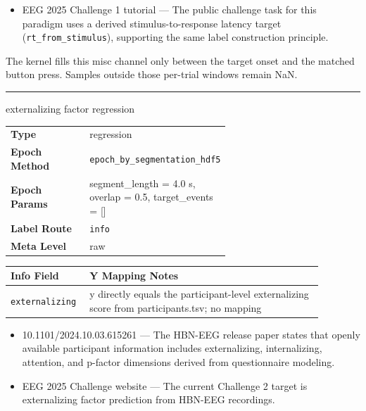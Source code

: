 {\begin{tcolorbox}
\begin{itemize}[leftmargin=1.3em,noitemsep,topsep=1pt]
\item[\scriptsize$\cdot$] {\scriptsize EEG 2025 Challenge 1 tutorial --- The public challenge task for this paradigm uses a derived stimulus-to-response latency target (\texttt{rt\_from\_stimulus}), supporting the same label construction principle.}
\end{itemize}
\par{} {\footnotesize The kernel fills this misc channel only between the target onset and the matched button press. Samples outside those per-trial windows remain NaN.}
\noindent\rule{\linewidth}{0.7pt}\par\nopagebreak
{} {\footnotesize externalizing factor regression}\par\smallskip
{\footnotesize\begin{tabular}{@{}lp{0.62\linewidth}@{}}
\textbf{Type} & regression \\
\textbf{Epoch Method} & \texttt{epoch\_by\_segmentation\_hdf5} \\
\textbf{Epoch Params} & segment\_length = 4.0 s, overlap = 0.5, target\_events = [] \\
\textbf{Label Route} & \texttt{info} \\
\textbf{Meta Level} & raw \\
\end{tabular}}
\par{}\par\smallskip
\begingroup\footnotesize
\begin{tabular}{@{}p{0.1760\linewidth}p{0.7040\linewidth}@{}}
\toprule
\textbf{Info Field} & \textbf{Y Mapping Notes} \\
\midrule
\texttt{externalizing} & y directly equals the participant-level externalizing score from participants.tsv; no mapping \\
\bottomrule
\end{tabular}
\endgroup
\par{}\par
\begin{itemize}[leftmargin=1.3em,noitemsep,topsep=1pt]
\item[\scriptsize$\cdot$] {\scriptsize 10.1101/2024.10.03.615261 --- The HBN-EEG release paper states that openly available participant information includes externalizing, internalizing, attention, and p-factor dimensions derived from questionnaire modeling.}
\item[\scriptsize$\cdot$] {\scriptsize EEG 2025 Challenge website --- The current Challenge 2 target is externalizing factor prediction from HBN-EEG recordings.}

\end{itemize}
\end{tcolorbox}}
